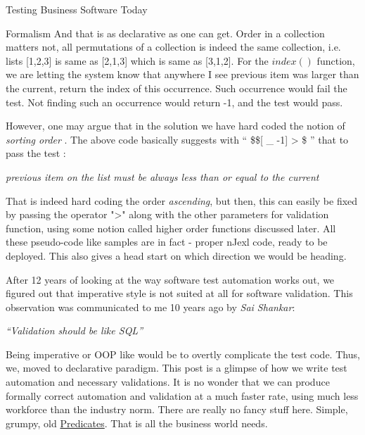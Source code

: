 \begin{section}{Testing Business Software Today}
\begin{subsection}{Formalism}
And that is as declarative as one can get. Order in a collection matters not, all permutations of a collection is indeed the same collection, i.e. lists [1,2,3] is same as [2,1,3] which is same as [3,1,2]. For the $index()$ function, we are letting the system know that anywhere I see previous item was larger than the current, return the index of this occurrence. Such occurrence would fail the test. Not finding such an occurrence would return -1, and the test would pass.

However, one may argue that in the solution we have hard coded the notion of \emph{sorting order} . The above code  basically suggests with 
`` \$\$[ \_ -1]  > \$ ''  that to pass the test :

\begin{center}
\emph{ previous item on the list must be always less than or equal to the current }
\end{center}

That is indeed hard coding the order \emph{ascending},  but then, this can easily be fixed by passing the operator 
">" along with the other parameters for validation function, using some notion called higher order functions discussed later. 
All these pseudo-code like samples are in fact - proper nJexl code, ready to be deployed. This also gives a head start on which direction we would be heading.
\end{subsection}

After 12 years of looking at the way  software test automation works out, we figured out that imperative style is not suited at all for software validation. This observation was communicated to me 10 years ago by \emph{Sai Shankar}:

\begin{center}
\emph{``Validation should be like SQL''}
\end{center}

Being imperative or OOP like would be to overtly  complicate the test code. Thus, we, moved to declarative paradigm. This post is a glimpse of how we write test automation and necessary validations. It is no wonder that we can produce formally correct automation and validation at a much faster rate, using much less workforce than the industry norm. There are really no fancy stuff here. Simple, grumpy, old 
\href{https://en.wikipedia.org/wiki/Predicate_logic}{Predicates}.  That is all the business world needs. 
\end{section}



